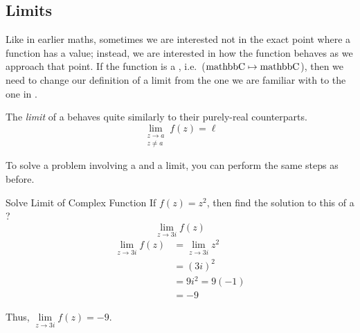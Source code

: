 \subsection{Limits}\label{subsec:Limits}
Like in earlier maths, sometimes we are interested not in the exact point where a function has a value; instead, we are interested in how the function behaves as we approach that point.
If the function is a , i.e.\ ($\operatorname{mathbb{C}} \mapsto \operatorname{mathbb{C}}$), then we need to change our definition of a limit from the one we are familiar with to the one in .

\begin{definition}[Limit]\label{def:Complex_Limit}
  The \emph{limit} of a  behaves quite similarly to their purely-real counterparts.
  \begin{equation}\label{eq:Complex_Limit}
    \lim\limits_{\substack{z \to a \\ z \neq a}} f(z) = \ell
  \end{equation}
\end{definition}

To solve a problem involving a  and a limit, you can perform the same steps as before.

\begin{example}[Lecture 5]{Solve Limit of Complex Function}
  If $f(z) = z^{2}$, then find the solution to this  of a ?
  \begin{equation*}
    \lim\limits_{z \to 3i} f(z)
  \end{equation*}
  \tcblower{}
  \begin{align*}
    \lim\limits_{z \to 3i} f(z) &= \lim\limits_{z \to 3i} z^{2} \\
                                &= {(3i)}^{2} \\
                                &= 9 i^{2} = 9 (-1) \\
                                &= -9
  \end{align*}

  Thus, $\lim\limits_{z \to 3i} f(z) = -9$.
\end{example}


